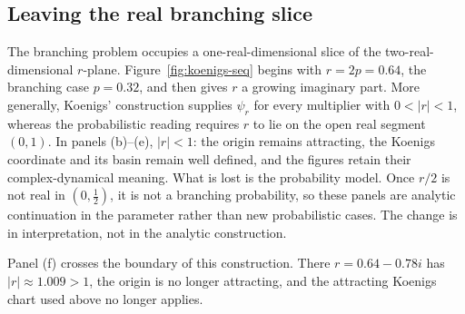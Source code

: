 \FloatBarrier

\subsection{Leaving the real branching slice}

The branching problem occupies a one-real-dimensional slice of the
two-real-dimensional $r$-plane. Figure~\ref{fig:koenigs-seq} begins with
$r=2p=0.64$, the branching case $p=0.32$, and then gives $r$ a growing
imaginary part. More generally, Koenigs' construction supplies $\psi_r$ for
every multiplier with $0<|r|<1$, whereas the probabilistic reading requires
$r$ to lie on the open real segment $(0,1)$. In panels (b)--(e), $|r|<1$: the
origin remains attracting, the Koenigs coordinate and its basin remain well
defined, and the figures retain their complex-dynamical meaning. What is lost
is the probability model. Once $r/2$ is not real in $(0,\tfrac12)$, it is not a
branching probability, so these panels are analytic continuation in the
parameter rather than new probabilistic cases. The change is in interpretation,
not in the analytic construction.

Panel (f) crosses the boundary of this construction. There
$r=0.64-0.78i$ has $|r|\approx1.009>1$, the origin is no longer attracting, and
the attracting Koenigs chart used above no longer applies.

